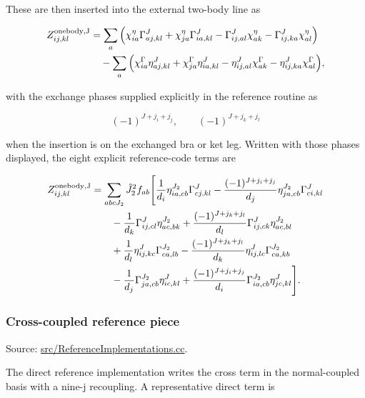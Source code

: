 \documentclass[
]{article}
\begin{document}
These are then inserted into the external two-body line as

\begin{equation}
\begin{aligned}
Z^{\rm onebody,J}_{ij,kl}
&=\sum_a\Big(
\chi^\eta_{ia}\Gamma^J_{aj,kl}
+\chi^\eta_{ja}\Gamma^J_{ia,kl}
-\Gamma^J_{ij,al}\chi^\eta_{ak}
-\Gamma^J_{ij,ka}\chi^\eta_{al}
\Big)\\
&\quad-\sum_a\Big(
\chi^\Gamma_{ia}\eta^J_{aj,kl}
+\chi^\Gamma_{ja}\eta^J_{ia,kl}
-\eta^J_{ij,al}\chi^\Gamma_{ak}
-\eta^J_{ij,ka}\chi^\Gamma_{al}
\Big),
\end{aligned}
\end{equation}

with the exchange phases supplied explicitly in the reference routine as

\begin{equation}
(-1)^{J+j_i+j_j},\qquad (-1)^{J+j_k+j_l}
\end{equation}

when the insertion is on the exchanged bra or ket leg. Written with
those phases displayed, the eight explicit reference-code terms are

\begin{equation}
\begin{aligned}
Z^{\rm onebody,J}_{ij,kl}
&=\sum_{abcJ_2}\hat J_2^2 f_{ab}
\Bigg[
\frac{1}{d_i}\eta^{J_2}_{ia,cb}\Gamma^J_{cj,kl}
-\frac{(-1)^{J+j_i+j_j}}{d_j}\eta^{J_2}_{ja,cb}\Gamma^J_{ci,kl}\\
&\qquad
-\frac{1}{d_k}\Gamma^J_{ij,cl}\eta^{J_2}_{ac,bk}
+\frac{(-1)^{J+j_k+j_l}}{d_l}\Gamma^J_{ij,ck}\eta^{J_2}_{ac,bl}\\
&\qquad
+\frac{1}{d_l}\eta^J_{ij,kc}\Gamma^{J_2}_{ca,lb}
-\frac{(-1)^{J+j_k+j_l}}{d_k}\eta^J_{ij,lc}\Gamma^{J_2}_{ca,kb}\\
&\qquad
-\frac{1}{d_j}\Gamma^{J_2}_{ja,cb}\eta^J_{ic,kl}
+\frac{(-1)^{J+j_i+j_j}}{d_i}\Gamma^{J_2}_{ia,cb}\eta^J_{jc,kl}
\Bigg].
\end{aligned}
\end{equation}

\subsubsection{Cross-coupled reference
piece}\label{cross-coupled-reference-piece}

Source:
\href{../src/ReferenceImplementations.cc\#L13428-L13549}{src/ReferenceImplementations.cc}.

The direct reference implementation writes the cross term in the
normal-coupled basis with a nine-j recoupling. A representative direct
term is
\end{document}
